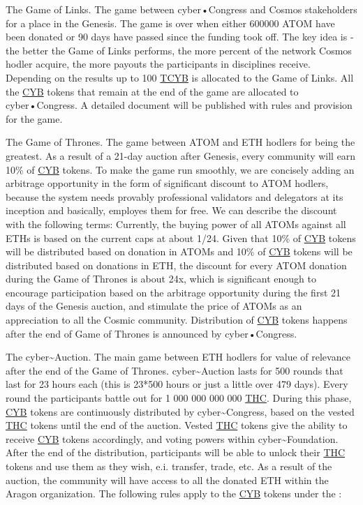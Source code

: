 \documentclass[8pt,oneside]{amsart}
\newcommand{\linkgreen}[2]{\href{#1}{\color{green}{#2}}}
\begin{document}
The Game of Links. The game between cyber•Congress and Cosmos stakeholders for a place in the Genesis. The game is over when either 600000 ATOM have been donated or 90 days have passed since the funding took off. The key idea is - the better the Game of Links performs, the more percent of the network Cosmos hodler acquire, the more payouts the participants in disciplines receive. Depending on the results up to 100 {\hyperref[cyb]{TCYB}} is allocated to the Game of Links. All the {\hyperref[cyb]{CYB}} tokens that remain at the end of the game are allocated to cyber•Congress. A detailed document will be published with rules and provision for the game.

The Game of Thrones. The game between ATOM and ETH hodlers for being the greatest. As a result of a 21-day auction after Genesis, every community will earn 10\% of {\hyperref[cyb]{CYB}} tokens. To make the game run smoothly, we are concisely adding an arbitrage opportunity in the form of significant discount to ATOM hodlers, because the system needs provably professional validators and delegators at its inception and basically, employes them for free. We can describe the discount with the following terms: Currently, the buying power of all ATOMs against all ETHs is based on the current caps at about 1/24. Given that 10\% of {\hyperref[cyb]{CYB}} tokens will be distributed based on donation in ATOMs and 10\% of {\hyperref[cyb]{CYB}} tokens will be distributed based on donations in ETH, the discount for every ATOM donation during the Game of Thrones is about 24x, which is significant enough to encourage participation based on the arbitrage opportunity during the first 21 days of the Genesis auction, and stimulate the price of ATOMs as an appreciation to all the Cosmic community. Distribution of {\hyperref[cyb]{CYB}} tokens happens after the end of Game of Thrones is announced by cyber•Congress.

The cyber\~{}Auction. The main game between ETH hodlers for value of relevance after the end of the Game of Thrones. cyber\~{}Auction lasts for 500 rounds that last for 23 hours each (this is 23*500 hours or just a little over 479 days). Every round the participants battle out for 1 000 000 000 000 {\hyperref[thc]{THC}}. During this phase, {\hyperref[cyb]{CYB}} tokens are continuously distributed by cyber\~{}Congress, based on the vested {\hyperref[thc]{THC}} tokens until the end of the auction. Vested {\hyperref[thc]{THC}} tokens give the ability to receive {\hyperref[cyb]{CYB}} tokens accordingly, and voting powers within cyber\~{}Foundation. After the end of the distribution, participants will be able to unlock their {\hyperref[thc]{THC}} tokens and use them as they wish, e.i. transfer, trade, etc. As a result of the auction, the community will have access to all the donated ETH within the Aragon organization. The following rules apply to the {\hyperref[cyb]{CYB}} tokens under the \linkgreen{https://cyberd.ai/account/cyber12v6jzx9vea277aqj0nffll8ewvme35w94yv258}{multisig for distribution}:
\end{document}
